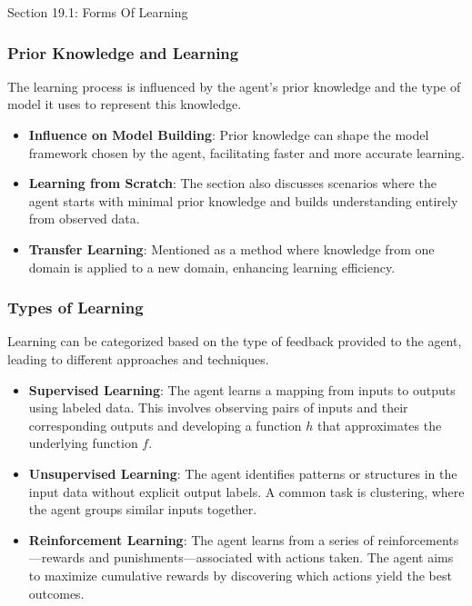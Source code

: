 \begin{notes}{Section 19.1: Forms Of Learning}
\begin{highlight}
    \end{highlight}
    
    \subsubsection*{Prior Knowledge and Learning}
    
    The learning process is influenced by the agent's prior knowledge and the type of model it uses to represent this knowledge.
    
    \begin{highlight}
    
        \begin{itemize}
            \item \textbf{Influence on Model Building}: Prior knowledge can shape the model framework chosen by the agent, facilitating faster and more accurate learning.
            \item \textbf{Learning from Scratch}: The section also discusses scenarios where the agent starts with minimal prior knowledge and builds understanding entirely from observed data.
            \item \textbf{Transfer Learning}: Mentioned as a method where knowledge from one domain is applied to a new domain, enhancing learning efficiency.
        \end{itemize}
    
    \end{highlight}
    
    \subsubsection*{Types of Learning}
    
    Learning can be categorized based on the type of feedback provided to the agent, leading to different approaches and techniques.
    
    \begin{highlight}
    
        \begin{itemize}
            \item \textbf{Supervised Learning}: The agent learns a mapping from inputs to outputs using labeled data. This involves observing pairs of inputs and their corresponding outputs and developing 
            a function $h$ that approximates the underlying function $f$.
            \item \textbf{Unsupervised Learning}: The agent identifies patterns or structures in the input data without explicit output labels. A common task is clustering, where the agent groups similar 
            inputs together.
            \item \textbf{Reinforcement Learning}: The agent learns from a series of reinforcements—rewards and punishments—associated with actions taken. The agent aims to maximize cumulative rewards by 
            discovering which actions yield the best outcomes.
        \end{itemize}
    

\end{highlight}
\end{notes}
